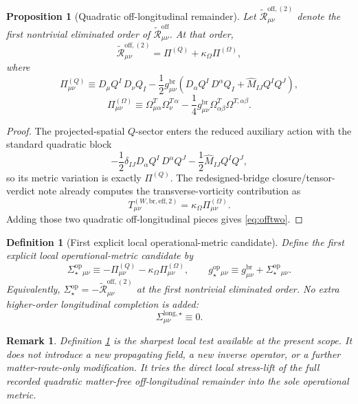 \documentclass[11pt]{article}
\newcommand{\ReBridge}{g^{\mathrm{br}}}
\newcommand{\OpMetricStar}{g^{\mathrm{op}}_\star}
\newcommand{\PiQ}{\Pi^{(Q)}}
\newcommand{\PiOmega}{\Pi^{(\Omega)}}
\newcommand{\SigmaOpStar}{\Sigma^{\mathrm{op}}_\star}
\newcommand{\ReOff}{\widetilde{\mathcal R}_{\mu\nu}^{\mathrm{off}}}
\newcommand{\ReOffTwo}{\widetilde{\mathcal R}_{\mu\nu}^{\mathrm{off},(2)}}
\newtheorem{definition}{Definition}
\newtheorem{proposition}{Proposition}
\newtheorem{remark}{Remark}
\begin{document}
\begin{proposition}[Quadratic off-longitudinal remainder]
\label{def:offtwo}
Let \(\ReOffTwo\) denote the first nontrivial eliminated order of \(\ReOff\). At that order,
\begin{equation}
\ReOffTwo
=
\PiQ+\kappa_\Omega\PiOmega,
\label{eq:offtwo}
\end{equation}
where
\begin{equation}
\PiQ_{\mu\nu}
\equiv
D_\mu Q^I\,D_\nu Q_I
-\frac12 \ReBridge_{\mu\nu}
\left(
D_\alpha Q^I\,D^\alpha Q_I+\widehat M_{IJ}Q^IQ^J
\right),
\label{eq:piQ}
\end{equation}
\begin{equation}
\PiOmega_{\mu\nu}
\equiv
\Omega_{\mu\alpha}^T\Omega_\nu^{T\,\alpha}
-\frac14 \ReBridge_{\mu\nu}\Omega_{\alpha\beta}^T\Omega^{T,\alpha\beta}.
\label{eq:piOmega}
\end{equation}
\end{proposition}

\begin{proof}
The projected-spatial \(Q\)-sector enters the reduced auxiliary action with the standard quadratic block
\[
-\frac12\delta_{IJ}D_\alpha Q^I\,D^\alpha Q^J
-\frac12\widehat M_{IJ}Q^IQ^J,
\]
so its metric variation is exactly \(\PiQ\). The redesigned-bridge closure/tensor-verdict note already computes the transverse-vorticity contribution as
\[
T_{\mu\nu}^{(W,\mathrm{br,eff},2)}
=
\kappa_\Omega\PiOmega_{\mu\nu}.
\]
Adding those two quadratic off-longitudinal pieces gives \eqref{eq:offtwo}.
\end{proof}

\begin{definition}[First explicit local operational-metric candidate]
\label{def:candidate}
Define the \emph{first explicit local operational-metric candidate} by
\begin{equation}
\SigmaOpStar{}_{\mu\nu}
\equiv
-\PiQ_{\mu\nu}
-\kappa_\Omega\PiOmega_{\mu\nu},
\qquad
\OpMetricStar{}_{\mu\nu}
\equiv
\ReBridge_{\mu\nu}+\SigmaOpStar{}_{\mu\nu}.
\label{eq:candidate}
\end{equation}
Equivalently, \(\SigmaOpStar=-\ReOffTwo\) at the first nontrivial eliminated order. No extra higher-order longitudinal completion is added:
\begin{equation}
\Sigma^{\mathrm{long},\star}_{\mu\nu}\equiv 0.
\label{eq:sigmalong}
\end{equation}
\end{definition}

\begin{remark}
Definition \ref{def:candidate} is the sharpest local test available at the present scope. It does not introduce a new propagating field, a new inverse operator, or a further matter-route-only modification. It tries the direct local stress-lift of the full recorded quadratic matter-free off-longitudinal remainder into the sole operational metric.
\end{remark}
\end{document}
